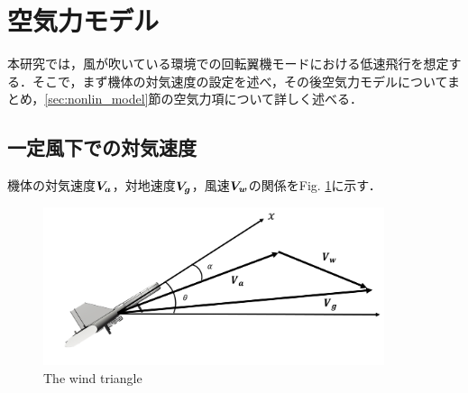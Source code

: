 \section{空気力モデル}
\label{sec:airf_model}

本研究では，風が吹いている環境での回転翼機モードにおける低速飛行を想定する．そこで，まず機体の対気速度の設定を述べ，その後空気力モデルについてまとめ，\ref{sec:nonlin_model}節の空気力項について詳しく述べる．

\subsection{一定風下での対気速度}
\label{sec:wind_speed}

機体の対気速度$\mbox{\boldmath $V_a$}$，対地速度$\mbox{\boldmath $V_g$}$，風速$\mbox{\boldmath $V_w$}$の関係をFig. \ref{fig:vel_air}に示す．

\begin{figure}[H]
	\centering
	\includegraphics[clip,width=10.0cm,bb=0 0 1500 700]{./z_figure_files/chapter3/5_Va_Vw.jpeg}
	\caption{The wind triangle}
	\label{fig:vel_air}
\end{figure}

